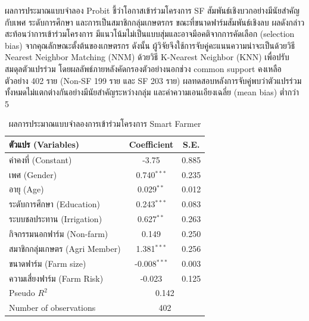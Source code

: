 ผลการประมาณแบบจำลอง Probit ชี้ว่าโอกาสเข้าร่วมโครงการ SF สัมพันธ์เชิงบวกอย่างมีนัยสำคัญกับเพศ ระดับการศึกษา และการเป็นสมาชิกกลุ่มเกษตรกร ขณะที่ขนาดฟาร์มสัมพันธ์เชิงลบ ผลดังกล่าวสะท้อนว่าการเข้าร่วมโครงการ
มีแนวโน้มไม่เป็นแบบสุ่มและอาจมีอคติจากการคัดเลือก (selection bias) จากคุณลักษณะตั้งต้นของเกษตรกร ดังนั้น ผู้วิจัยจึงใช้การจับคู่คะแนนความน่าจะเป็นด้วยวิธี Nearest Neighbor Matching (NNM) ด้วยวิธี K-Nearest Neighbor (KNN) เพื่อปรับสมดุลตัวแปรร่วม โดยผลลัพธ์ภายหลังคัดกรองตัวอย่างนอกช่วง common support คงเหลือตัวอย่าง 402 ราย (Non-SF 199 ราย และ SF 203 ราย) ผลทดสอบหลังการจับคู่พบว่าตัวแปรร่วมทั้งหมดไม่แตกต่างกันอย่างมีนัยสำคัญระหว่างกลุ่ม และค่าความเอนเอียงเฉลี่ย (mean bias) ต่ำกว่า 5%

\begin{table}[ht]
\centering
\small
\setlength{\tabcolsep}{4pt}
\renewcommand{\arraystretch}{1.1}

\caption{ผลการประมาณแบบจำลองการเข้าร่วมโครงการ Smart Farmer}
\label{tab:logit}

\begin{tabular}{lcc}
\hline
\textbf{ตัวแปร (Variables)} & \textbf{Coefficient} & \textbf{S.E.} \\
\hline

ค่าคงที่ (Constant) & -3.75 & 0.885 \\
เพศ (Gender) & 0.740$^{***}$ & 0.235 \\
อายุ (Age) & 0.029$^{**}$ & 0.012 \\
ระดับการศึกษา (Education) & 0.243$^{***}$ & 0.083 \\
ระบบชลประทาน (Irrigation) & 0.627$^{**}$ & 0.263 \\
กิจกรรมนอกฟาร์ม (Non-farm) & 0.149 & 0.250 \\
สมาชิกกลุ่มเกษตร (Agri Member) & 1.381$^{***}$ & 0.256 \\
ขนาดฟาร์ม (Farm size) & -0.008$^{***}$ & 0.003 \\
ความเสี่ยงฟาร์ม (Farm Risk) & -0.023 & 0.125 \\

\hline
Pseudo $R^2$ & \multicolumn{2}{c}{0.142} \\
Number of observations & \multicolumn{2}{c}{402} \\
\hline
\end{tabular}
\end{table}

